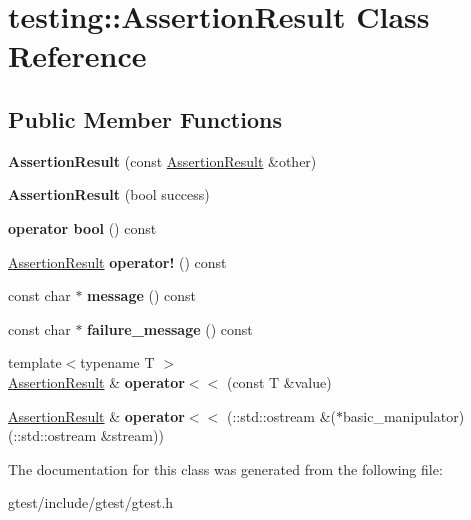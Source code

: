 \hypertarget{classtesting_1_1AssertionResult}{}\section{testing\+:\+:Assertion\+Result Class Reference}
\label{classtesting_1_1AssertionResult}
\subsection*{Public Member Functions}
\begin{DoxyCompactItemize}
\item 
\mbox{\label{classtesting_1_1AssertionResult_a27788116f03f90aec4daf592fd809ead}} 
{\bfseries Assertion\+Result} (const \hyperlink{classtesting_1_1AssertionResult}{Assertion\+Result} \&other)
\item 
\mbox{\label{classtesting_1_1AssertionResult_ade695178c05c4b2f82e92930c912fc25}} 
{\bfseries Assertion\+Result} (bool success)
\item 
\mbox{\label{classtesting_1_1AssertionResult_ab3f34b1623c82762ef4a8f52b535159c}} 
{\bfseries operator bool} () const
\item 
\mbox{\label{classtesting_1_1AssertionResult_a5b0784686a756660ac8dfe528d89386b}} 
\hyperlink{classtesting_1_1AssertionResult}{Assertion\+Result} {\bfseries operator!} () const
\item 
\mbox{\label{classtesting_1_1AssertionResult_a33c14dafd28e3393c841e03f4b70a017}} 
const char $\ast$ {\bfseries message} () const
\item 
\mbox{\label{classtesting_1_1AssertionResult_aa38908d5a48c912434a80c8725f52583}} 
const char $\ast$ {\bfseries failure\+\_\+message} () const
\item 
\mbox{\label{classtesting_1_1AssertionResult_a3230efa81aafe7c61f5fb878cfa39e91}} 
{\footnotesize template$<$typename T $>$ }\\\hyperlink{classtesting_1_1AssertionResult}{Assertion\+Result} \& {\bfseries operator$<$$<$} (const T \&value)
\item 
\mbox{\label{classtesting_1_1AssertionResult_a43ae8a260843ce2ff3dc9af262672b8b}} 
\hyperlink{classtesting_1_1AssertionResult}{Assertion\+Result} \& {\bfseries operator$<$$<$} (\+::std\+::ostream \&($\ast$basic\+\_\+manipulator)(\+::std\+::ostream \&stream))
\end{DoxyCompactItemize}


The documentation for this class was generated from the following file\+:\begin{DoxyCompactItemize}
\item 
gtest/include/gtest/gtest.\+h\end{DoxyCompactItemize}
